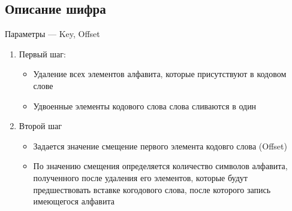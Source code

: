 \documentclass[a4paper, 14pt]{extarticle}
\begin{document}
\subsection{Описание шифра}
Параметры --- Key, Offset
\begin{enumerate}
    \item Первый шаг:
    \begin{itemize}
        \item Удаление всех элементов алфавита, которые присутствуют в кодовом слове
        \item Удвоенные элементы кодового слова слова сливаются в один
    \end{itemize}
    \item Второй шаг
    \begin{itemize}
        \item Задается значение смещение первого элемента кодовго слова (Offset)
        \item По значению смещения определяется количество символов алфавита, полученного после удаления его элементов, которые будут предшествовать вставке когодового слова, после которого запись имеющегося алфавита
    \end{itemize}
\end{enumerate}
\end{document}
